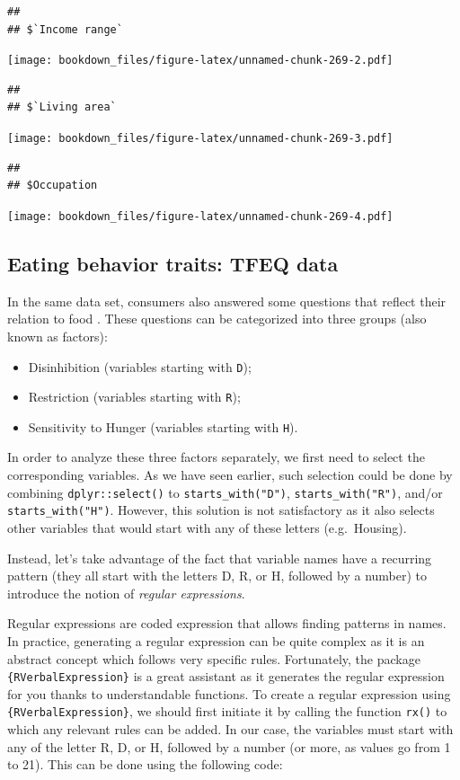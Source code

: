 \documentclass[
]{krantz}
\providecommand{\tightlist}{%
  \setlength{\itemsep}{0pt}\setlength{\parskip}{0pt}}
\begin{document}
\begin{verbatim}
## 
## $`Income range`
\end{verbatim}

\texttt{[image: bookdown\_files/figure-latex/unnamed-chunk-269-2.pdf]}

\begin{verbatim}
## 
## $`Living area`
\end{verbatim}

\texttt{[image: bookdown\_files/figure-latex/unnamed-chunk-269-3.pdf]}

\begin{verbatim}
## 
## $Occupation
\end{verbatim}

\texttt{[image: bookdown\_files/figure-latex/unnamed-chunk-269-4.pdf]}

\hypertarget{regex}{%
\subsection{Eating behavior traits: TFEQ data}\label{regex}}

In the same data set, consumers also answered some questions that reflect their relation to food \citep{stunkard1985}. These questions can be categorized into three groups (also known as factors):

\begin{itemize}
\tightlist
\item
  Disinhibition (variables starting with \texttt{D});
\item
  Restriction (variables starting with \texttt{R});
\item
  Sensitivity to Hunger (variables starting with \texttt{H}).
\end{itemize}

In order to analyze these three factors separately, we first need to select the corresponding variables. As we have seen earlier, such selection could be done by combining \texttt{dplyr::select()} to \texttt{starts\_with("D")}, \texttt{starts\_with("R")}, and/or \texttt{starts\_with("H")}. However, this solution is not satisfactory as it also selects other variables that would start with any of these letters (e.g.~Housing).

Instead, let's take advantage of the fact that variable names have a recurring pattern (they all start with the letters D, R, or H, followed by a number) to introduce the notion of \emph{regular expressions}.

Regular expressions are coded expression that allows finding patterns in names. In practice, generating a regular expression can be quite complex as it is an abstract concept which follows very specific rules. Fortunately, the package \texttt{\{RVerbalExpression\}} is a great assistant as it generates the regular expression for you thanks to understandable functions.
To create a regular expression using \texttt{\{RVerbalExpression\}}, we should first initiate it by calling the function \texttt{rx()} to which any relevant rules can be added. In our case, the variables must start with any of the letter R, D, or H, followed by a number (or more, as values go from 1 to 21). This can be done using the following code:
\end{document}
